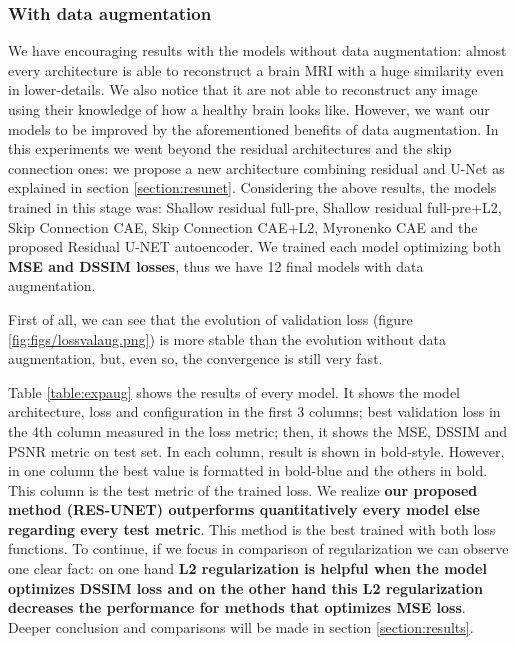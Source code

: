 \FloatBarrier

\subsubsection{With data augmentation}

We have encouraging results with the models without data augmentation: almost every architecture is able to reconstruct a brain MRI with a huge similarity even in lower-details. We also notice that it are not able to reconstruct any image using their knowledge of how a healthy brain looks like. However, we want our models to be improved by the aforementioned benefits of data augmentation. In this experiments we went beyond the residual architectures and the skip connection ones: we propose a new architecture combining residual and U-Net as explained in section \ref{section:resunet}. Considering the above results, the models trained in this stage was: Shallow residual full-pre, Shallow residual full-pre+L2, Skip Connection CAE, Skip Connection CAE+L2, Myronenko CAE and the proposed Residual U-NET autoencoder. We trained each model optimizing both \textbf{MSE and DSSIM losses}, thus we have 12 final models with data augmentation.

First of all, we can see that the evolution of validation loss (figure \ref{fig:figs/lossvalaug.png}) is more stable than the evolution without data augmentation, but, even so, the convergence is still very fast. 


Table \ref{table:expaug} shows the results of every model. It shows the model architecture, loss and configuration in the first 3 columns; best validation loss in the 4th column measured in the loss metric; then, it shows the MSE, DSSIM and PSNR metric on test set. In each column, result is shown in bold-style. However, in one column the best value is formatted in bold-blue and the others in bold. This column is the test metric of the trained loss. We realize \textbf{our proposed method (RES-UNET) outperforms quantitatively every model else regarding every test metric}. This method is the best trained with both loss functions. To continue, if we focus in comparison of regularization we can observe one clear fact: on one hand \textbf{L2 regularization is helpful when the model optimizes DSSIM loss and on the other hand this L2 regularization decreases the performance for methods that optimizes MSE loss}. Deeper conclusion and comparisons will be made in section \ref{section:results}.



